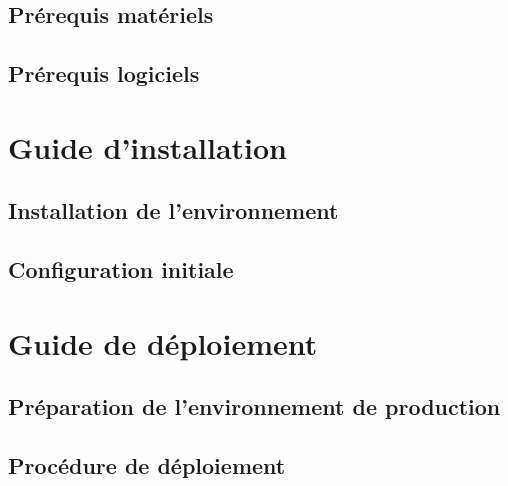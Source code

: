 \begin{appendices}
    \subsection{Prérequis matériels}


    \subsection{Prérequis logiciels}


    \section{Guide d'installation}


    \subsection{Installation de l'environnement}


    \subsection{Configuration initiale}


    \section{Guide de déploiement}


    \subsection{Préparation de l'environnement de production}


    \subsection{Procédure de déploiement}



\end{appendices}
